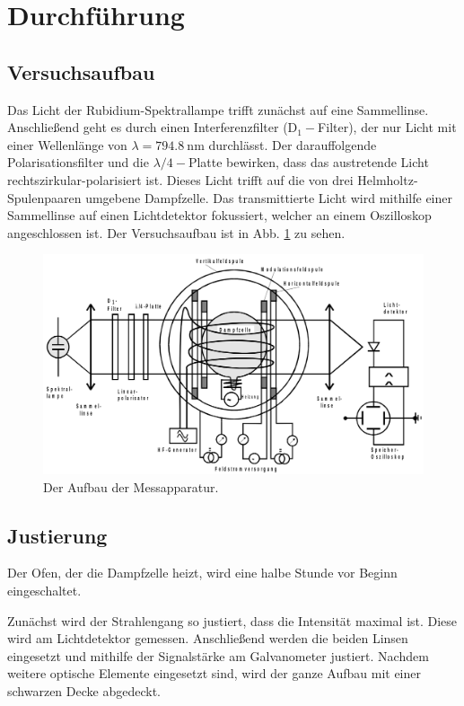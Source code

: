 \section{Durchführung}
\label{sec:Durchführung}

\subsection{Versuchsaufbau}
Das Licht der Rubidium-Spektrallampe trifft zunächst auf eine Sammellinse. Anschließend geht es durch einen Interferenzfilter (D$_1-$Filter), der nur Licht mit einer Wellenlänge von $\lambda = \SI{794.8}{\nano\meter}$ durchlässt. Der darauffolgende Polarisationsfilter und die $\lambda / 4-$Platte bewirken, dass das austretende Licht rechtszirkular-polarisiert ist. Dieses Licht trifft auf die von drei Helmholtz-Spulenpaaren umgebene Dampfzelle. Das transmittierte Licht wird mithilfe einer Sammellinse auf einen Lichtdetektor fokussiert, welcher an einem Oszilloskop angeschlossen ist. \cite{V21}
Der Versuchsaufbau ist in Abb. \ref{fig:aufbau} zu sehen.

\begin{figure}
    \centering
    \includegraphics[width=15cm]{fotos/aufbau.png}
    \caption{Der Aufbau der Messapparatur. \cite{V21}}
    \label{fig:aufbau}
\end{figure}

\subsection{Justierung}
Der Ofen, der die Dampfzelle heizt, wird eine halbe Stunde vor Beginn eingeschaltet. \cite{V21}

Zunächst wird der Strahlengang so justiert, dass die Intensität maximal ist. Diese wird am Lichtdetektor gemessen.
Anschließend werden die beiden Linsen eingesetzt und mithilfe der Signalstärke am Galvanometer justiert.
Nachdem weitere optische Elemente eingesetzt sind, wird der ganze Aufbau mit einer schwarzen Decke abgedeckt. \cite{V21}

